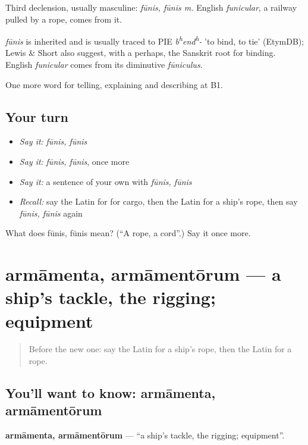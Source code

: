 Third declension, usually masculine: \emph{fūnis, fūnis m.} English \emph{funicular}, a railway pulled by a rope, comes from it.

\begin{cousinweb}
\emph{fūnis} is inherited and is usually traced to PIE \emph{b\textsuperscript{h}end\textsuperscript{h}-} 'to bind, to tie' (EtymDB); Lewis \& Short also suggest, with a perhaps, the Sanskrit root for binding. English \emph{funicular} comes from its diminutive \emph{fūniculus}.
\end{cousinweb}

\begin{grammarlens}[title={What you've built}]
One more word for telling, explaining and describing at B1.
\end{grammarlens}

\subsection*{Your turn}
\begin{itemize}
\raggedright
  \item \emph{Say it:} \emph{fūnis, fūnis}
  \item \emph{Say it:} \emph{fūnis, fūnis}, once more
  \item \emph{Say it:} a sentence of your own with \emph{fūnis, fūnis}
  \item \emph{Recall:} say the Latin for for cargo, then the Latin for a ship's rope, then say \emph{fūnis, fūnis} again
\end{itemize}

\begin{tcolorbox}[breakable,colback=teal!4,colframe=teal!35!black,title={Before you move on}]
What does fūnis, fūnis mean? (\textquotedblleft{}A rope, a cord\textquotedblright{}.) Say it once more.
\end{tcolorbox}
\section[armāmenta, armāmentōrum]{armāmenta, armāmentōrum — a ship's tackle, the rigging; equipment}

\label{lesson:LA-C437-armamenta}



\begin{quote}
Before the new one: say the Latin for a ship's rope, then the Latin for a rope.
\end{quote}

\subsection*{You'll want to know: armāmenta, armāmentōrum}
\textbf{armāmenta, armāmentōrum} — \textquotedblleft{}a ship's tackle, the rigging; equipment\textquotedblright{}.

